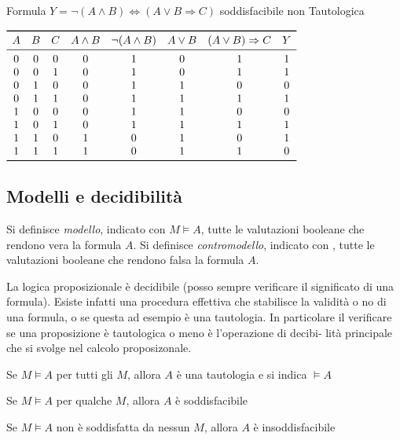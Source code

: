 Formula $Y = \neg(A \land B) \iff (A \lor B \Rightarrow C)$ soddisfacibile non Tautologica

$\begin{array}{cccccccc}
\toprule
A & B & C & A \land B & \neg(A \land B) & A \lor B & (A \lor B) \Rightarrow C & Y \\
\midrule
0 & 0 & 0 & 0 & 1 & 0 & 1 & 1 \\
0 & 0 & 1 & 0 & 1 & 0 & 1 & 1 \\
0 & 1 & 0 & 0 & 1 & 1 & 0 & 0 \\
0 & 1 & 1 & 0 & 1 & 1 & 1 & 1 \\
1 & 0 & 0 & 0 & 1 & 1 & 0 & 0 \\
1 & 0 & 1 & 0 & 1 & 1 & 1 & 1 \\
1 & 1 & 0 & 1 & 0 & 1 & 0 & 1 \\
1 & 1 & 1 & 1 & 0 & 1 & 1 & 0 \\
\bottomrule
\end{array}$

\subsection{Modelli e decidibilità}
Si definisce \emph{modello}, indicato con $M \models A$, tutte le valutazioni booleane
che rendono vera la formula $A$.
Si definisce \emph{contromodello}, indicato con , tutte le valutazioni booleane
che rendono falsa la formula $A$.

La logica proposizionale è decidibile (posso sempre verificare il significato di una formula).
Esiste infatti una procedura effettiva che stabilisce la validità o no di una formula, o se questa
ad esempio è una tautologia.
In particolare il verificare se una proposizione è tautologica o meno è l’operazione di decibi-
lità principale che si svolge nel calcolo proposizonale.

\begin{defi}
    Se $M \models A$ per tutti gli $M$, allora $A$ è una tautologia e si indica $\models A$
\end{defi}

\begin{defi}
    Se $M \models A$ per qualche $M$, allora $A$ è soddisfacibile
\end{defi}

\begin{defi}
Se $M \models A$ non è soddisfatta da nessun $M$, allora $A$ è insoddisfacibile
\end{defi}
